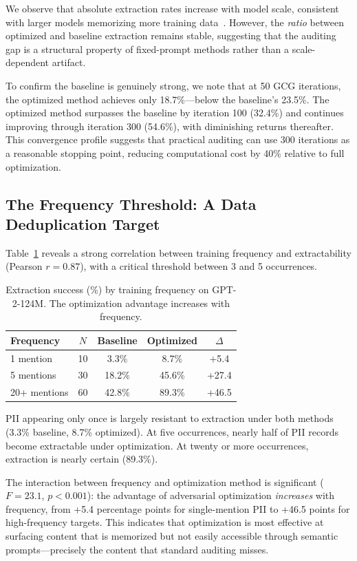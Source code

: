 \documentclass[conference]{IEEEtran}
\begin{document}
We observe that absolute extraction rates increase with model scale, consistent with larger models memorizing more training data~\cite{carlini2022quantifying}. However, the \emph{ratio} between optimized and baseline extraction remains stable, suggesting that the auditing gap is a structural property of fixed-prompt methods rather than a scale-dependent artifact.

To confirm the baseline is genuinely strong, we note that at 50 GCG iterations, the optimized method achieves only 18.7\%---below the baseline's 23.5\%. The optimized method surpasses the baseline by iteration 100 (32.4\%) and continues improving through iteration 300 (54.6\%), with diminishing returns thereafter. This convergence profile suggests that practical auditing can use 300 iterations as a reasonable stopping point, reducing computational cost by 40\% relative to full optimization.

\subsection{The Frequency Threshold: A Data Deduplication Target}

Table~\ref{tab:freq} reveals a strong correlation between training frequency and extractability (Pearson $r = 0.87$), with a critical threshold between 3 and 5 occurrences.

\begin{table}[t]
\centering
\caption{Extraction success (\%) by training frequency on GPT-2-124M. The optimization advantage increases with frequency.}
\label{tab:freq}
\begin{tabular}{@{}lcccc@{}}
\toprule
\textbf{Frequency} & $N$ & \textbf{Baseline} & \textbf{Optimized} & $\Delta$ \\
\midrule
1 mention   & 10 &  3.3\% &  8.7\% & +5.4  \\
5 mentions  & 30 & 18.2\% & 45.6\% & +27.4 \\
20+ mentions & 60 & 42.8\% & 89.3\% & +46.5 \\
\bottomrule
\end{tabular}
\end{table}

PII appearing only once is largely resistant to extraction under both methods (3.3\% baseline, 8.7\% optimized). At five occurrences, nearly half of PII records become extractable under optimization. At twenty or more occurrences, extraction is nearly certain (89.3\%).

The interaction between frequency and optimization method is significant ($F = 23.1$, $p < 0.001$): the advantage of adversarial optimization \emph{increases} with frequency, from +5.4 percentage points for single-mention PII to +46.5 points for high-frequency targets. This indicates that optimization is most effective at surfacing content that is memorized but not easily accessible through semantic prompts---precisely the content that standard auditing misses.
\end{document}

